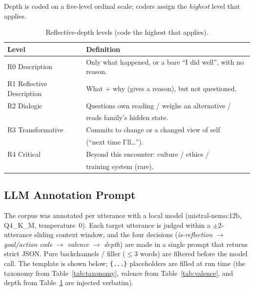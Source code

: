 Depth is coded on a five-level ordinal scale; coders assign the \emph{highest} level that applies.

\begin{table}[h]
\centering
\small
\caption{Reflective-depth levels (code the highest that applies).}
\label{tab:levels}
\begin{tabular}{@{}ll@{}}
\toprule
\textbf{Level} & \textbf{Definition} \\
\midrule
R0 Description & Only what happened, or a bare ``I did well'', with no reason. \\
R1 Reflective Description & What + why (gives a reason), but not questioned. \\
R2 Dialogic & Questions own reading / weighs an alternative / \\
            & reads family's hidden state. \\
R3 Transformative & Commits to change or a changed view of self \\
                  & (``next time I'll\ldots''). \\
R4 Critical & Beyond this encounter: culture / ethics / \\
            & training system (rare). \\
\bottomrule
\end{tabular}
\end{table}

\subsection{LLM Annotation Prompt}
\label{app:prompt}

The corpus was annotated per utterance with a local model (mistral-nemo:12b, Q4\_K\_M,
temperature~0). Each target utterance is judged within a $\pm2$-utterance sliding context
window, and the four decisions (\textit{is-reflection} $\rightarrow$ \textit{goal/action code}
$\rightarrow$ \textit{valence} $\rightarrow$ \textit{depth}) are made in a single prompt that
returns strict JSON. Pure backchannels / filler ($\leq 3$ words) are filtered before the model
call. The template is shown below; \texttt{\{...\}} placeholders are filled at run time (the
taxonomy from Table~\ref{tab:taxonomy}, valence from Table~\ref{tab:valence}, and depth from
Table~\ref{tab:levels} are injected verbatim).

